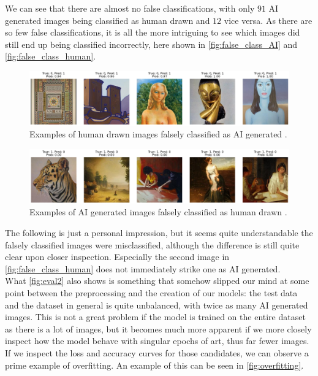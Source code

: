 We can see that there are almost no false classifications, with only $91$ AI generated images being classified as human drawn and $12$ vice versa.
As there are so few false classifications, it is all the more intriguing to see which images did still end up being classified incorrectly, 
here shown in \autoref{fig:false_class_AI} and \autoref{fig:false_class_human}.

\begin{figure}[h!]
    \centering
    \includegraphics[width=.8\textwidth]{images/top_misclassified_img.png}
    \caption{Examples of human drawn images falsely classified as AI generated \cite{aiartbench}.}
    \label{fig:false_class_AI}
\end{figure}

\begin{figure}[h!]
    \centering
    \includegraphics[width=.8\textwidth]{images/bot_misclassified_img.png}
    \caption{Examples of AI generated images falsely classified as human drawn \cite{aiartbench}.}
    \label{fig:false_class_human}
\end{figure}

The following is just a personal impression, but it seems quite understandable the falsely classified images were misclassified, 
although the difference is still quite clear upon closer inspection.
Especially the second image in \autoref{fig:false_class_human} does not immediately strike one as AI generated. \\

What \autoref{fig:eval2} also shows is something that somehow slipped our mind at some point between the preprocessing and the creation of our models:
the test data and the dataset in general is quite unbalanced, with twice as many AI generated images.
This is not a great problem if the model is trained on the entire dataset as there is a lot of images, but it becomes much more apparent
if we more closely inspect how the model behave with singular epochs of art, thus far fewer images.
If we inspect the loss and accuracy curves for those candidates, we can observe a prime example of overfitting.
An example of this can be seen in \autoref{fig:overfitting}.

